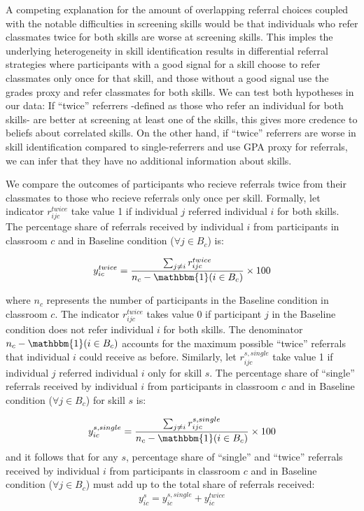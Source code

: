 \documentclass[11pt,a4paper,oneside]{article}
\begin{document}
A competing explanation for the amount of overlapping referral choices coupled with the notable difficulties in screening skills would be that individuals who refer classmates twice for both skills are worse at screening skills. This imples the underlying heterogeneity in skill identification results in differential referral strategies where participants with a good signal for a skill choose to refer classmates only once for that skill, and those without a good signal use the grades proxy and refer classmates for both skills. We can test both hypotheses in our data: If ``twice'' referrers -defined as those who refer an individual for both skills- are better at screening at least one of the skills, this gives more credence to beliefs about correlated skills. On the other hand, if ``twice'' referrers are worse in skill identification compared to single-referrers and use GPA proxy for referrals, we can infer that they have no additional information about skills. 

We compare the outcomes of participants who recieve referrals twice from their classmates to those who recieve referrals only once per skill. Formally, let indicator $r_{ijc}^{twice}$ take value 1 if individual $j$ referred individual $i$ for both skills. The percentage share of referrals received by individual $i$ from participants in classroom $c$ and in Baseline condition ($\forall j \in B_c$) is: 

\begin{equation}
  y_{ic}^{twice} = \frac{\sum_{j \neq i} r_{ijc}^{twice}}{n_c - \mathbbm{1}(i \in B_c)} \times 100
  \end{equation}

where $n_c$ represents the number of participants in the Baseline condition in classroom $c$. The indicator $r_{ijc}^{twice}$ takes value 0 if participant $j$ in the Baseline condition does not refer individual $i$ for both skills. The denominator $n_c - \mathbbm{1}(i \in B_c)$ accounts for the maximum possible ``twice'' referrals that individual $i$ could receive as before. Similarly, let $r_{ijc}^{s,single}$ take value 1 if individual $j$ referred individual $i$ only for skill $s$. The percentage share of ``single'' referrals received by individual $i$ from participants in classroom $c$ and in Baseline condition ($\forall j \in B_c$) for skill $s$ is: 

\begin{equation}\label{single_def}
  y_{ic}^{s,single} = \frac{\sum_{j \neq i} r_{ijc}^{s,single}}{n_c - \mathbbm{1}(i \in B_c)} \times 100
  \end{equation}
and it follows that for any $s$, percentage share of ``single'' and ``twice'' referrals received by individual $i$ from participants in classroom $c$ and in Baseline condition ($\forall j \in B_c$) must add up to the total share of referrals received:
\begin{equation}\label{single_twice}
  y_{ic}^{s} = y_{ic}^{s,single} + y_{ic}^{twice}
  \end{equation}
\end{document}
